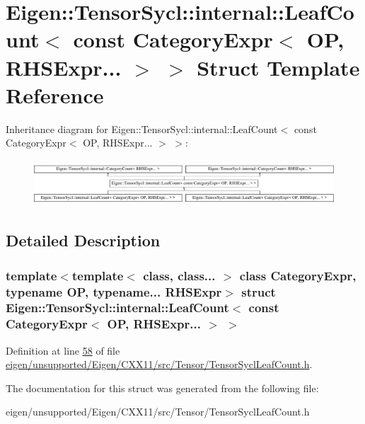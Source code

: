 \hypertarget{struct_eigen_1_1_tensor_sycl_1_1internal_1_1_leaf_count_3_01const_01_category_expr_3_01_o_p_00_01_r_h_s_expr_8_8_8_01_4_01_4}{}\section{Eigen\+:\+:Tensor\+Sycl\+:\+:internal\+:\+:Leaf\+Count$<$ const Category\+Expr$<$ OP, R\+H\+S\+Expr... $>$ $>$ Struct Template Reference}
\label{struct_eigen_1_1_tensor_sycl_1_1internal_1_1_leaf_count_3_01const_01_category_expr_3_01_o_p_00_01_r_h_s_expr_8_8_8_01_4_01_4}
Inheritance diagram for Eigen\+:\+:Tensor\+Sycl\+:\+:internal\+:\+:Leaf\+Count$<$ const Category\+Expr$<$ OP, R\+H\+S\+Expr... $>$ $>$\+:\begin{figure}[H]
\begin{center}
\leavevmode
\includegraphics[height=1.731959cm]{struct_eigen_1_1_tensor_sycl_1_1internal_1_1_leaf_count_3_01const_01_category_expr_3_01_o_p_00_01_r_h_s_expr_8_8_8_01_4_01_4}
\end{center}
\end{figure}


\subsection{Detailed Description}
\subsubsection*{template$<$template$<$ class, class... $>$ class Category\+Expr, typename OP, typename... R\+H\+S\+Expr$>$\newline
struct Eigen\+::\+Tensor\+Sycl\+::internal\+::\+Leaf\+Count$<$ const Category\+Expr$<$ O\+P, R\+H\+S\+Expr... $>$ $>$}



Definition at line \hyperlink{eigen_2unsupported_2_eigen_2_c_x_x11_2src_2_tensor_2_tensor_sycl_leaf_count_8h_source_l00058}{58} of file \hyperlink{eigen_2unsupported_2_eigen_2_c_x_x11_2src_2_tensor_2_tensor_sycl_leaf_count_8h_source}{eigen/unsupported/\+Eigen/\+C\+X\+X11/src/\+Tensor/\+Tensor\+Sycl\+Leaf\+Count.\+h}.



The documentation for this struct was generated from the following file\+:\begin{DoxyCompactItemize}
\item 
eigen/unsupported/\+Eigen/\+C\+X\+X11/src/\+Tensor/\+Tensor\+Sycl\+Leaf\+Count.\+h\end{DoxyCompactItemize}
